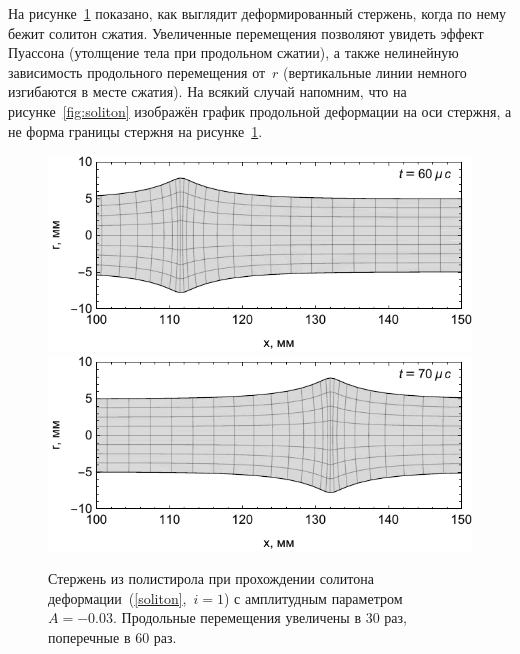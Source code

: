 \documentclass[12pt, a4paper]{report}
\begin{document}
На рисунке~\ref{fig:rod_deformed} показано, как выглядит деформированный стержень, когда по нему бежит солитон сжатия. Увеличенные перемещения позволяют увидеть эффект Пуассона (утолщение тела при продольном сжатии), а также нелинейную зависимость продольного перемещения от~$r$ (вертикальные линии немного изгибаются в месте сжатия). На всякий случай напомним, что на рисунке~\ref{fig:soliton} изображён график продольной деформации на оси стержня, а не форма границы стержня на рисунке~\ref{fig:rod_deformed}. 
\begin{figure}[hh]
	\centering
	\includegraphics[width=0.6\linewidth]{4a_DeformedRod1}
	\includegraphics[width=0.6\linewidth]{4b_DeformedRod2}
	\caption{Стержень из полистирола при прохождении солитона деформации~(\ref{soliton},~${i=1}$) с амплитудным параметром $A=-0.03$. Продольные перемещения увеличены в 30 раз, поперечные в 60 раз.}
	\label{fig:rod_deformed}
\end{figure}
\end{document}
